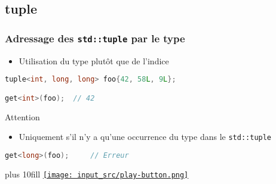 \documentclass[C++.tex]{subfiles}
\begin{document}
\subsection*{tuple}
\begin{frame}[fragile]
	\frametitle{Adressage des \lstinline|std::tuple| par le type}
	\begin{itemize}
		\item Utilisation du type plutôt que de l'indice
	\end{itemize}

	\begin{lstlisting}[language=C++]
tuple<int, long, long> foo{42, 58L, 9L};

get<int>(foo);	// 42\end{lstlisting}

	\begin{alertblock}{Attention}
		\begin{itemize}
			\item Uniquement s'il n'y a qu'une occurrence du type dans le \lstinline|std::tuple|
		\end{itemize}

		\begin{lstlisting}[language=C++]
get<long>(foo);     // Erreur\end{lstlisting}
	\end{alertblock}

	\vskip 10mm plus 10fill
	\hfill
	\href{https://godbolt.org/#g:!((g:!((g:!((h:codeEditor,i:(filename:'1',fontScale:14,fontUsePx:'0',j:1,lang:c%2B%2B,selection:(endColumn:6,endLineNumber:9,positionColumn:6,positionLineNumber:9,selectionStartColumn:6,selectionStartLineNumber:9,startColumn:6,startLineNumber:9),source:'%23include+%3Ciostream%3E%0A%23include+%3Ctuple%3E%0A%0Aint+main()%0A%7B%0A++std::tuple%3Cint,+long,+long%3E+foo%7B42,+58L,+9L%7D%3B%0A%0A++std::cout+%3C%3C+std::get%3Cint%3E(foo)+%3C%3C+!'%5Cn!'%3B%0A%23if+0%0A++std::cout+%3C%3C+std::get%3Clong%3E(foo)+%3C%3C+!'%5Cn!'%3B%0A%23endif%0A%7D%0A'),l:'5',n:'0',o:'C%2B%2B+source+%231',t:'0')),k:50,l:'4',n:'0',o:'',s:0,t:'0'),(g:!((h:executor,i:(argsPanelShown:'1',compilationPanelShown:'0',compiler:g122,compilerName:'',compilerOutShown:'0',execArgs:'',execStdin:'',fontScale:14,fontUsePx:'0',j:1,lang:c%2B%2B,libs:!((name:boost,ver:'175')),options:'-std%3Dc%2B%2B14+-Wall+-Wextra',source:1,stdinPanelShown:'1',tree:'1',wrap:'0'),l:'5',n:'0',o:'Executor+x86-64+gcc+12.2+(C%2B%2B,+Editor+%231)',t:'0')),header:(),k:50,l:'4',n:'0',o:'',s:0,t:'0')),l:'2',n:'0',o:'',t:'0')),version:4}{\texttt{[image: input\_src/play-button.png]}}
\end{frame}
\end{document}
